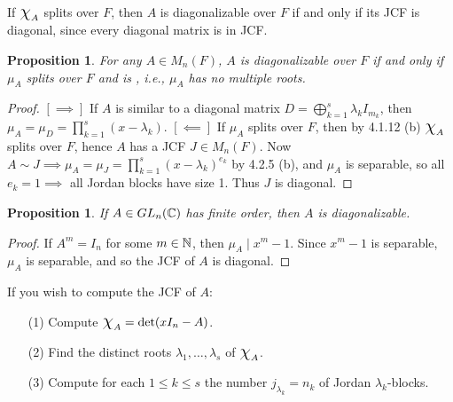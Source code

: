\documentclass[11pt]{book}
\newcounter{counter}
\newtheorem{proposition}[counter]{Proposition}   \newtheorem{problem}[counter]{Problem}   \newtheorem*{proposition*}{Proposition}   \newtheorem*{lemma*}{Lemma}
\theoremstyle{definition}   \newtheorem{defn}[counter]{Definition} %
\newcommand{\Chi}{\mbox{\Large $\chi$}}
\newcommand{\vs}{\vspace{8pt}}
\numberwithin{counter}{chapter}
\begin{document}
\vs

\begin{remark}
If $\Chi_A$ splits over $F$, then $A$ is diagonalizable over $F$ if and only if its JCF is diagonal, since every diagonal matrix is in JCF.
\end{remark}

\vs

\begin{proposition}
For any $A \in M_n(F)$, $A$ is diagonalizable over $F$ if and only if $\mu_A$ splits over $F$ and is , i.e., $\mu_A$ has no multiple roots. 
\end{proposition}

\begin{proof}
$[\implies]$ If $A$ is similar to a diagonal matrix $D = \bigoplus_{k=1}^s \lambda_k I_{m_k}$, then $\mu_A = \mu_D = \prod_{k=1}^s (x-\lambda_k)$. $[\impliedby]$ If $\mu_A$ splits over $F$, then by 4.1.12 (b) $\Chi_A$ splits over $F$, hence $A$ has a JCF $J \in M_n(F)$. Now $A \sim J \implies \mu_A = \mu_J = \prod_{k=1}^s (x-\lambda_k)^{e_k}$ by 4.2.5 (b), and $\mu_A$ is separable, so all $e_k = 1 \implies$ all Jordan blocks have size 1. Thus $J$ is diagonal. 
\end{proof}

\vs

\begin{proposition}
If $A \in GL_n(\operatorname{\mathbb{C}})$ has finite order, then $A$ is diagonalizable.
\end{proposition}

\begin{proof}
If $A^m = I_n$ for some $m \in \operatorname{\mathbb{N}}$, then $\mu_A \mid x^m-1$. Since $x^m-1$ is separable, $\mu_A$ is separable, and so the JCF of $A$ is diagonal. 
\end{proof}

\vs

\begin{remark*}
If you wish to compute the JCF of $A$:
\begin{enumerate}
\item[(1)] Compute $\Chi_A = \det(xI_n - A)$.
\item[(2)] Find the distinct roots $\lambda_1,\dots,\lambda_s$ of $\Chi_A$.
\item[(3)] Compute for each $1 \leq k \leq s$ the number $j_{\lambda_k} = n_k$ of Jordan $\lambda_k$-blocks. 
\end{enumerate}
\end{remark*}

\vs
\end{document}
